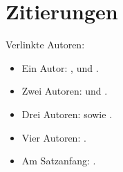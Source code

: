 \documentclass[ngerman]{scrbook}
\begin{document}
\chapter{Zitierungen}
Verlinkte Autoren:

\begin{itemize}
  \item Ein Autor: \citeauthor{Ez10} \cite{Ez10}, \citeauthor{Go10} \cite{Go10} und \citeauthor{latexcookbook} \cite{latexcookbook}.
  \item Zwei Autoren: \citeauthor{AB00} \cite{AB00} und \citeauthor{vdAW2013} \cite{vdAW2013}.
  \item Drei Autoren: \citeauthor{ABC01} \cite{ABC01} sowie \citeauthor{jabref} \cite{jabref}.
  \item Vier Autoren: \citeauthor{ABCD02} \cite{ABCD02}.
  \item Am Satzanfang: .
\end{itemize}

\nocite{*}
\printbibliography
\end{document}
